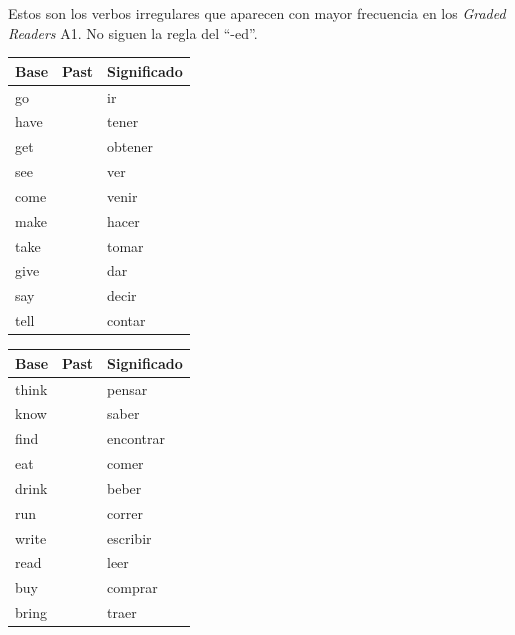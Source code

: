 \documentclass[12pt,a4paper]{article}
\begin{document}
\begin{cajagrammar}
Estos son los verbos irregulares que aparecen con mayor frecuencia en los \textit{Graded Readers} A1. No siguen la regla del ``-ed''.

\medskip
\begin{multicols}{2}
\begin{tabularx}{\linewidth}{@{} l l l @{}}
\toprule
\textbf{Base} & \textbf{Past} & \textbf{Significado} \\
\midrule
go & \eng{went} & ir \\
have & \eng{had} & tener \\
get & \eng{got} & obtener \\
see & \eng{saw} & ver \\
come & \eng{came} & venir \\
make & \eng{made} & hacer \\
take & \eng{took} & tomar \\
give & \eng{gave} & dar \\
say & \eng{said} & decir \\
tell & \eng{told} & contar \\
\bottomrule
\end{tabularx}

\columnbreak

\begin{tabularx}{\linewidth}{@{} l l l @{}}
\toprule
\textbf{Base} & \textbf{Past} & \textbf{Significado} \\
\midrule
think & \eng{thought} & pensar \\
know & \eng{knew} & saber \\
find & \eng{found} & encontrar \\
eat & \eng{ate} & comer \\
drink & \eng{drank} & beber \\
run & \eng{ran} & correr \\
write & \eng{wrote} & escribir \\
read & \eng{read} & leer \\
buy & \eng{bought} & comprar \\
bring & \eng{brought} & traer \\
\bottomrule
\end{tabularx}
\end{multicols}
\end{cajagrammar}

\end{document}
